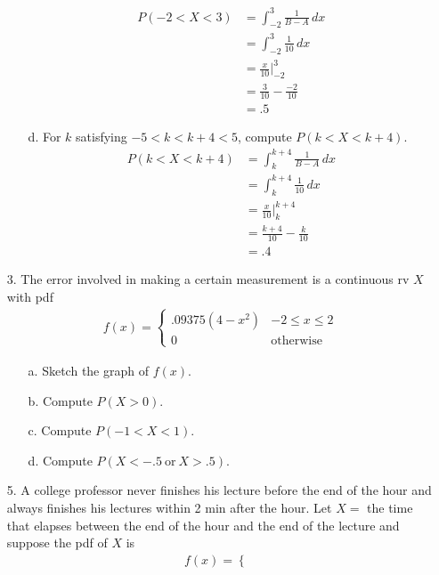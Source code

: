 \documentclass[letterpaper,12pt]{article}
\begin{document}
\begin{enumerate}
\begin{enumerate}
        \begin{align*}
          P(-2 < X < 3) &= \int_{-2}^{3} \frac{1}{B - A}\,dx \\
          &= \int_{-2}^{3} \frac{1}{10}\,dx \\
          &= \frac{x}{10}\bigg\rvert_{-2}^{3} \\
          &= \frac{3}{10} - \frac{-2}{10} \\
          &= .5
        \end{align*}
      \item[d.]
        For $k$ satisfying $-5 < k < k + 4 < 5$, compute $P(k < X < k + 4)$.
        \begin{align*}
          P(k < X < k + 4) &= \int_{k}^{k + 4} \frac{1}{B - A}\,dx \\
          &= \int_{k}^{k + 4} \frac{1}{10}\,dx \\
          &= \frac{x}{10}\bigg\rvert_{k}^{k + 4} \\
          &= \frac{k + 4}{10} - \frac{k}{10} \\
          &= .4
        \end{align*}
    \end{enumerate}
  \item[3.]
    The error involved in making a certain measurement is a continuous rv $X$ with pdf
    \begin{align*}
      f(x) = \begin{cases}
        .09375(4 - x^2) & -2 \le x \le 2 \\
        0               & \text{otherwise}
      \end{cases}
    \end{align*}
    \begin{enumerate}
      \item[a.]
        Sketch the graph of $f(x)$.
      \item[b.]
        Compute $P(X > 0)$.
      \item[c.]
        Compute $P(-1 < X < 1)$.
      \item[d.]
        Compute $P(X < -.5\ \text{or}\ X > .5)$.
    \end{enumerate}
  \item[5.]
    A college professor never finishes his lecture before the end of the hour and always finishes his lectures within 2 min after the hour. Let $X =$ the time that elapses between the end of the hour and the end of the lecture and suppose the pdf of $X$ is
    \begin{align*}
      f(x) = \begin{cases}

\end{cases}
\end{align*}
\end{enumerate}
\end{document}
